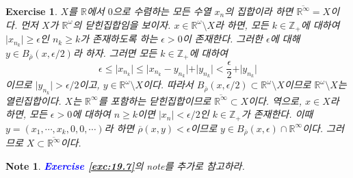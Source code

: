 \documentclass{article}
\newtheorem{exercise}{Exercise}[section]
\newtheorem*{note}{Note}
\newcommand{\R}{\mathbb{R}}
\newcommand{\Z}{\mathbb{Z}}
\begin{document}
\begin{exercise}
    $X$를 $\R$에서 $0$으로 수렴하는 모든 수열 $x_n$의 집합이라 하면 $\overline{\R^\infty}=X$이다. 먼저 $X$가 $\R^\omega$의 닫힌집합임을 보이자. $x\in\R^\omega\setminus X$라 하면, 모든 $k\in\Z_+$에 대하여 $\vert x_{n_k}\vert\geq\epsilon$인 $n_k\geq k$가 존재하도록 하는 $\epsilon>0$이 존재한다. 그러한 $\epsilon$에 대해 $y\in B_{\overline{\rho}}(x,\epsilon/2)$라 하자. 그러면 모든 $k\in\Z_+$에 대하여
    \[
        \epsilon\leq\vert x_{n_k}\vert\leq\vert x_{n_k}-y_{n_k}\vert+\vert y_{n_k}\vert<\frac{\epsilon}{2}+\vert y_{n_k}\vert
    \]
    이므로 $\vert y_{n_k}\vert>\epsilon/2$이고, $y\in\R^\omega\setminus X$이다. 따라서 $B_{\overline{\rho}}(x,\epsilon/2)\subset\R^\omega\setminus X$이므로 $\R^\omega\setminus X$는 열린집합이다. $X$는 $\R^\infty$를 포함하는 닫힌집합이므로 $\overline{\R^\infty}\subset X$이다. 역으로, $x\in X$라 하면, 모든 $\epsilon>0$에 대하여 $n\geq k$이면 $\vert x_n\vert<\epsilon/2$인 $k\in\Z_+$가 존재한다. 이때 $y=(x_1,\cdots,x_k,0,0,\cdots)$라 하면 $\overline{\rho}(x,y)<\epsilon$이므로 $y\in B_{\overline{\rho}}(x,\epsilon)\cap\R^\infty$이다. 그러므로 $X\subset\overline{\R^\infty}$이다.
\end{exercise}
\begin{note}
    \textcolor{blue}{\textbf{Exercise \ref{exc:19.7}}}의 note를 추가로 참고하라.
\end{note}
\end{document}
